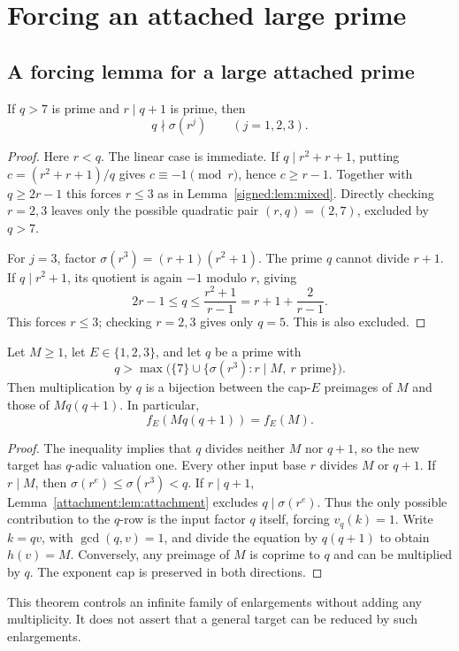 \chapter{Forcing an attached large prime}\label{ch:attachment}
\section{A forcing lemma for a large attached prime}
\begin{lemma}\label{attachment:lem:attachment}
If $q>7$ is prime and $r\mid q+1$ is prime, then
\[
 q\nmid\sigma(r^j)\qquad(j=1,2,3).
\]
\end{lemma}
\begin{proof}
Here $r<q$. The linear case is immediate. If $q\mid r^2+r+1$, putting $c=(r^2+r+1)/q$ gives $c\equiv-1\pmod r$, hence $c\ge r-1$. Together with $q\ge2r-1$ this forces $r\le3$ as in Lemma~\ref{signed:lem:mixed}. Directly checking $r=2,3$ leaves only the possible quadratic pair $(r,q)=(2,7)$, excluded by $q>7$.

For $j=3$, factor $\sigma(r^3)=(r+1)(r^2+1)$. The prime $q$ cannot divide $r+1$. If $q\mid r^2+1$, its quotient is again $-1$ modulo $r$, giving
\[
 2r-1\le q\le\frac{r^2+1}{r-1}=r+1+\frac2{r-1}.
\]
This forces $r\le3$; checking $r=2,3$ gives only $q=5$. This is also excluded.
\end{proof}

\begin{theorem}\label{attachment:thm:lift}
Let $M\ge1$, let $E\in\{1,2,3\}$, and let $q$ be a prime with
\[
 q>\max\bigl(\{7\}\cup\{\sigma(r^3):r\mid M,\ r\text{ prime}\}\bigr).
\]
Then multiplication by $q$ is a bijection between the cap-$E$ preimages of $M$ and those of $Mq(q+1)$. In particular,
\[
 \boxed{f_E(Mq(q+1))=f_E(M).}
\]
\end{theorem}
\begin{proof}
The inequality implies that $q$ divides neither $M$ nor $q+1$, so the new target has $q$-adic valuation one. Every other input base $r$ divides $M$ or $q+1$. If $r\mid M$, then $\sigma(r^e)\le\sigma(r^3)<q$. If $r\mid q+1$, Lemma~\ref{attachment:lem:attachment} excludes $q\mid\sigma(r^e)$. Thus the only possible contribution to the $q$-row is the input factor $q$ itself, forcing $v_q(k)=1$. Write $k=qv$, with $\gcd(q,v)=1$, and divide the equation by $q(q+1)$ to obtain $h(v)=M$. Conversely, any preimage of $M$ is coprime to $q$ and can be multiplied by $q$. The exponent cap is preserved in both directions.
\end{proof}

This theorem controls an infinite family of enlargements without adding any multiplicity. It does not assert that a general target can be reduced by such enlargements.

